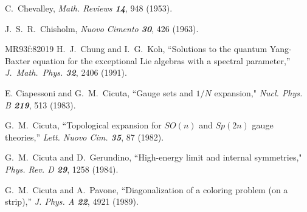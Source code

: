  C.~Chevalley,
{\em Math.  Reviews  \bf 14}, 948 (1953).

 J.~S.~R.~Chisholm,
{\em Nuovo Cimento  \bf 30}, 426 (1963).

        {MR93f:82019}
H.~J.~Chung and I.~G.~Koh,
``Solutions to the quantum Yang-Baxter
  equation for the exceptional Lie algebras with a spectral parameter,''
{\em J.~Math.~Phys. \bf 32}, 2406 (1991). %

 E. Ciapessoni and G.~M.~Cicuta,
     ``Gauge sets and $1/N$ expansion,"
    {\em Nucl. Phys. B \bf 219},  513 (1983). %

 G.~M.~Cicuta, %
        ``Topological expansion for $SO(n)$ and $Sp(2n)$ gauge theories,''
        {\em Lett. Nuovo Cim. \bf 35}, 87 (1982).

 G.~M.~Cicuta and D.~Gerundino, %
    ``High-energy limit and internal symmetries,"
    {\em Phys. Rev. D \bf 29}, 1258 (1984). %

 G.~M.~Cicuta and A.~Pavone,
    ``Diagonalization of a coloring problem (on a strip),''
    {\em J. Phys. A \bf 22}, 4921 (1989).

